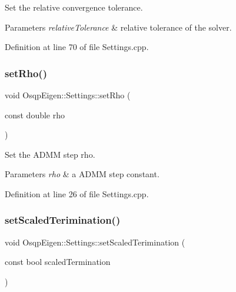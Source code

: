 Set the relative convergence tolerance. 


\begin{DoxyParams}{Parameters}
{\em relative\+Tolerance} & relative tolerance of the solver. \\
\hline
\end{DoxyParams}


Definition at line 70 of file Settings.\+cpp.

\mbox{\label{classOsqpEigen_1_1Settings_a7412ba8eb706c52d80673628c54d2a40}} 
\subsubsection{\texorpdfstring{set\+Rho()}{setRho()}}
{\footnotesize\ttfamily void Osqp\+Eigen\+::\+Settings\+::set\+Rho (\begin{DoxyParamCaption}\item[{const double}]{rho }\end{DoxyParamCaption})}



Set the A\+D\+MM step rho. 


\begin{DoxyParams}{Parameters}
{\em rho} & a A\+D\+MM step constant. \\
\hline
\end{DoxyParams}


Definition at line 26 of file Settings.\+cpp.

\mbox{\label{classOsqpEigen_1_1Settings_ab7d836e9f75480452c7e353e64608a31}} 
\subsubsection{\texorpdfstring{set\+Scaled\+Terimination()}{setScaledTerimination()}}
{\footnotesize\ttfamily void Osqp\+Eigen\+::\+Settings\+::set\+Scaled\+Terimination (\begin{DoxyParamCaption}\item[{const bool}]{scaled\+Termination }\end{DoxyParamCaption})}




